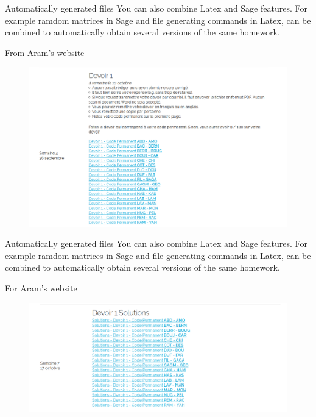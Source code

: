 \documentclass{beamer}
\begin{document}
	\begin{frame}{Automatically generated files}
		You can also combine Latex and Sage features. For example ramdom matrices in Sage and file generating commands in Latex, can be combined to automatically obtain several versions of the same homework. \newline
		
		\footnotesize{From Aram's website}
		\begin{figure}[h]
			\centering
			\includegraphics[scale=.2]{img1.png}
		\end{figure}
		
	\end{frame}
	\begin{frame}{Automatically generated files}
	You can also combine Latex and Sage features. For example ramdom matrices in Sage and file generating commands in Latex, can be combined to automatically obtain several versions of the same homework. \newline
	
	\footnotesize{For Aram's website}
	\begin{figure}[h]
		\centering
		\includegraphics[scale=.2]{img2.png}
	\end{figure}
	
	\end{frame}
\end{document}
